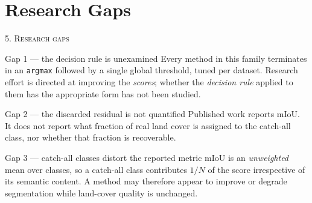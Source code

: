 \documentclass[aspectratio=169]{beamer}
\begin{document}
\section{Research Gaps}
\begin{frame}{\textsc{5. Research gaps}}
\small
\begin{block}{Gap 1 --- the decision rule is unexamined}
Every method in this family terminates in an \texttt{argmax} followed by a single
global threshold, tuned per dataset. Research effort is directed at improving the
\emph{scores}; whether the \emph{decision rule} applied to them has the
appropriate form has not been studied.
\end{block}
\begin{block}{Gap 2 --- the discarded residual is not quantified}
Published work reports mIoU. It does not report what fraction of real land cover
is assigned to the catch-all class, nor whether that fraction is recoverable.
\end{block}
\begin{block}{Gap 3 --- catch-all classes distort the reported metric}
mIoU is an \emph{unweighted} mean over classes, so a catch-all class contributes
$1/N$ of the score irrespective of its semantic content. A method may therefore
appear to improve or degrade segmentation while land-cover quality is unchanged.
\end{block}
\end{frame}

\end{document}
